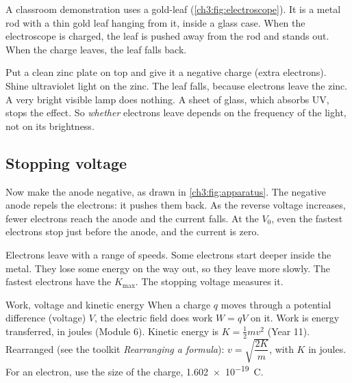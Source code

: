 \begin{sidebyside}[0.4]
  \label{ch3:fig:electroscope}
\nextside
  A classroom demonstration uses a gold-leaf 
  (\cref{ch3:fig:electroscope}). It is a metal rod with a thin gold leaf hanging from
  it, inside a glass case. When the electroscope is charged, the leaf is pushed away
  from the rod and stands out. When the charge leaves, the leaf falls back.\par\smallskip
  Put a clean zinc plate on top and give it a negative charge (extra electrons).
  Shine ultraviolet light on the zinc. The leaf falls, because electrons leave the
  zinc. A very bright visible lamp does nothing. A sheet of glass, which absorbs UV,
  stops the effect. So \emph{whether} electrons leave depends on the frequency of the
  light, not on its brightness.
\end{sidebyside}

\subsection{Stopping voltage}

Now make the anode negative, as drawn in \cref{ch3:fig:apparatus}. The negative anode repels the
electrons: it pushes them back. As the reverse voltage increases, fewer electrons
reach the anode and the current falls. At the  $V_0$, even the
fastest electrons stop just before the anode, and the current is zero.

Electrons leave with a range of speeds. Some electrons start deeper inside the
metal. They lose some energy on the way out, so they leave more slowly. The fastest
electrons have the  $K_\mathrm{max}$. The stopping
voltage measures it.

\begin{refresher}{Work, voltage and kinetic energy}
When a charge $q$ moves through a potential difference (voltage) $V$, the electric
field does work $W = qV$ on it. Work is energy transferred, in joules (Module 6).
Kinetic energy is $K = \frac12 mv^2$ (Year 11). Rearranged (see the toolkit
\emph{Rearranging a formula}): $v = \sqrt{\dfrac{2K}{m}}$, with $K$ in joules. For an
electron, use the size of the charge, \qty{1.602e-19}{C}.
\end{refresher}

